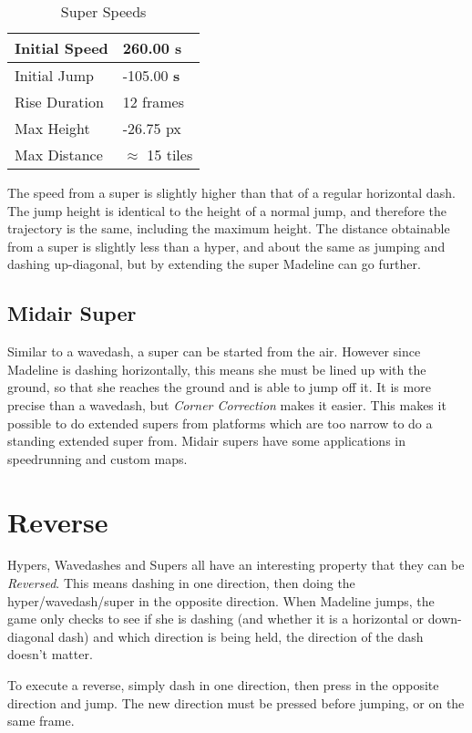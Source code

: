 \documentclass[oneside]{book}
\newcommand{\s}{\textbf{s}}
\begin{document}
\begin{table}[h]
\begin{tabular}{|l|l|}
\hline
Initial Speed&260.00 \s\\
\hline
Initial Jump&-105.00 \s\\
\hline
Rise Duration&12 frames\\
\hline
Max Height&-26.75 px\\
\hline
Max Distance&$\approx$ 15 tiles\\
\hline
\end{tabular}
\caption{Super Speeds}
\end{table}

The speed from a super is slightly higher than that of a regular horizontal dash. The jump height is identical to the height of a normal jump, and therefore the trajectory is the same, including the maximum height. The distance obtainable from a super is slightly less than a hyper, and about the same as jumping and dashing up-diagonal, but by extending the super Madeline can go further.

\subsection{Midair Super}

Similar to a wavedash, a super can be started from the air. However since Madeline is dashing horizontally, this means she must be lined up with the ground, so that she reaches the ground and is able to jump off it. It is more precise than a wavedash, but \textit{Corner Correction} makes it easier. This makes it possible to do extended supers from platforms which are too narrow to do a standing extended super from. Midair supers have some applications in speedrunning and custom maps.

\section{Reverse}

Hypers, Wavedashes and Supers all have an interesting property that they can be \textit{Reversed}. This means dashing in one direction, then doing the hyper/wavedash/super in the opposite direction. When Madeline jumps, the game only checks to see if she is dashing (and whether it is a horizontal or down-diagonal dash) and which direction is being held, the direction of the dash doesn't matter.

To execute a reverse, simply dash in one direction, then press in the opposite direction and jump. The new direction must be pressed before jumping, or on the same frame.
\end{document}
